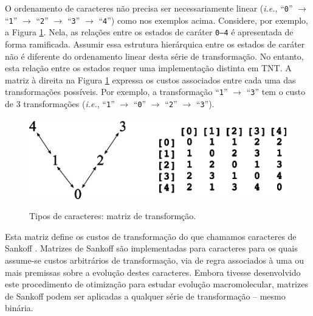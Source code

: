 \begin{refsection}
O ordenamento de caracteres não precisa ser necessariamente linear (\textit{i.e.}, ``\texttt{0}'' $\rightarrow$ ``\texttt{1}'' $\rightarrow$ ``\texttt{2}'' $\rightarrow$ ``\texttt{3}'' $\rightarrow$ ``\texttt{4}'') como nos exemplos acima. Considere, por exemplo, a Figura \ref{tut6:fig:chartypes_matrix}. Nela, as relações entre os estados de caráter \texttt{0--4} é apresentada de forma ramificada. Assumir essa estrutura hierárquica entre os estados de caráter não é diferente do ordenamento linear desta série de transformação. No entanto, esta relação entre os estados requer uma implementação distinta em TNT. A matriz à direita na Figura \ref{tut6:fig:chartypes_matrix} expressa os custos associados entre cada uma das transformações possíveis. Por exemplo, a transformação ``\texttt{1}'' $\rightarrow$ ``\texttt{3}'' tem o custo de 3 transformações (\textit{i.e.}, ``\texttt{1}'' $\rightarrow$ ``\texttt{0}'' $\rightarrow$ ``\texttt{2}'' $\rightarrow$ ``\texttt{3}'').


  \begin{figure}[H]
       \centering
      {\includegraphics[scale=1.00]{figures/tut6/character_types_matrix.eps}}
	{\caption[Tipos de caracteres: matriz de transformção]{Tipos de caracteres: matriz de transformção.}\label{tut6:fig:chartypes_matrix}}
  \end{figure}


Esta matriz define os custos de transformação do que chamamos caracteres de Sankoff \parencite{Sankoff_1975}. Matrizes de Sankoff são implementadas para caracteres para os quais assume-se custos arbitrários de transformação, via de regra associados à uma ou mais premissas sobre a evolução destes caracteres. Embora \textcite{Sankoff_1975} tivesse desenvolvido este procedimento de otimização para estudar evolução macromolecular, matrizes de Sankoff podem ser aplicadas a qualquer série de transformação -- mesmo binária.


\end{refsection}
